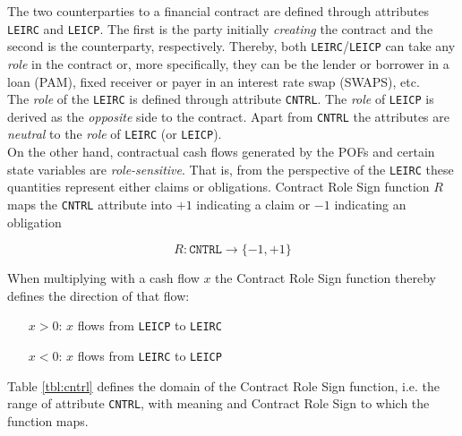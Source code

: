 \documentclass[9pt,oneside]{amsart}
\newcommand{\attr}[1]{\texttt{#1}}
\begin{document}
\begin{multicols}{2}
The two counterparties to a financial contract are defined through attributes \attr{LEIRC} and \attr{LEICP}. The first is the party initially \textit{creating} the contract and the second is the counterparty, respectively. Thereby, both \attr{LEIRC}/\attr{LEICP} can take any \textit{role} in the contract or, more specifically, they can be the lender or borrower in a loan (PAM), fixed receiver or payer in an interest rate swap (SWAPS), etc.\\

The \textit{role} of the \attr{LEIRC} is defined through attribute \attr{CNTRL}. The \textit{role} of \attr{LEICP} is derived as the \textit{opposite} side to the contract. Apart from \attr{CNTRL} the attributes are \textit{neutral} to the \textit{role} of \attr{LEIRC} (or \attr{LEICP}).\\

On the other hand, contractual cash flows generated by the POFs and certain state variables are \textit{role-sensitive}. That is, from the perspective of the \attr{LEIRC} these quantities represent either claims or obligations. Contract Role Sign function $R$ maps the \attr{CNTRL} attribute into $+1$ indicating a claim or $-1$ indicating an obligation

\[
	R : \attr{CNTRL} \rightarrow \{-1, +1 \}
\]

When multiplying with a cash flow $x$ the Contract Role Sign function thereby defines the direction of that flow:

\begin{itemize}
	\item[$x>0$:] $x$ flows from \attr{LEICP} to \attr{LEIRC}
	
	\item[$x<0$:] $x$ flows from \attr{LEIRC} to \attr{LEICP}
\end{itemize}

Table \ref{tbl:cntrl} defines the domain of the Contract Role Sign function, i.e. the range of attribute \attr{CNTRL}, with meaning and Contract Role Sign to which the function maps.





\end{multicols}
\end{document}
